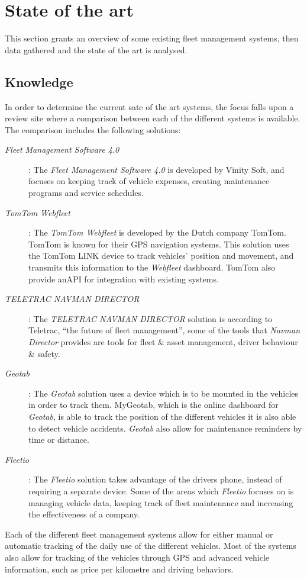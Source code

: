 \section{State of the art}
\label{sec:SOTA}
This section grants an overview of some existing fleet management systems, then data gathered and the state of the art is analysed.

\subsection{Knowledge}\label{sub:Knowledge}
In order to determine the current sate of the art systems, the focus falls upon a review site where a comparison between each of the different systems is available\cite{top20fleetmanagement}.
The comparison includes the following solutions:
\begin{description}
    \item [\textit{Fleet Management Software 4.0}]\cite{vinitysoft}: The \textit{Fleet Management Software 4.0} is developed by Vinity Soft, and focuses on keeping track of vehicle expenses, creating maintenance programs and service schedules.
    \item [\textit{TomTom Webfleet}]\cite{tomtom}: The \textit{TomTom Webfleet} is developed by the Dutch company TomTom. TomTom is known for their GPS navigation systems. This solution uses the TomTom LINK device to track vehicles' position and movement, and transmits this information to the \textit{Webfleet} dashboard. TomTom also provide anAPI for integration with existing systems.
    \item [\textit{TELETRAC NAVMAN DIRECTOR}]\cite{teletracnavman}: The \textit{TELETRAC NAVMAN DIRECTOR} solution is according to Teletrac, \enquote{the future of fleet management}, some of the tools that \textit{Navman Director} provides are tools for fleet \& asset management, driver behaviour \& safety.
    \item [\textit{Geotab}]\cite{geotab}: The \textit{Geotab} solution uses a device which is to be mounted in the vehicles in order to track them. MyGeotab, which is the online dashboard for \textit{Geotab}, is able to track the position of the different vehicles it is also able to detect vehicle accidents.
    \textit{Geotab} also allow for maintenance reminders by time or distance.
    \item [\textit{Fleetio}]\cite{fleetio}: The \textit{Fleetio} solution takes advantage of the drivers phone, instead of requiring a separate device. Some of the areas which \textit{Fleetio} focuses on is managing vehicle data, keeping track of fleet maintenance and increasing the effectiveness of a company.
\end{description}
Each of the different fleet management systems allow for either manual or automatic tracking of the daily use of the different vehicles.
Most of the systems also allow for tracking of the vehicles through GPS and advanced vehicle information, such as price per kilometre and driving behaviors.

